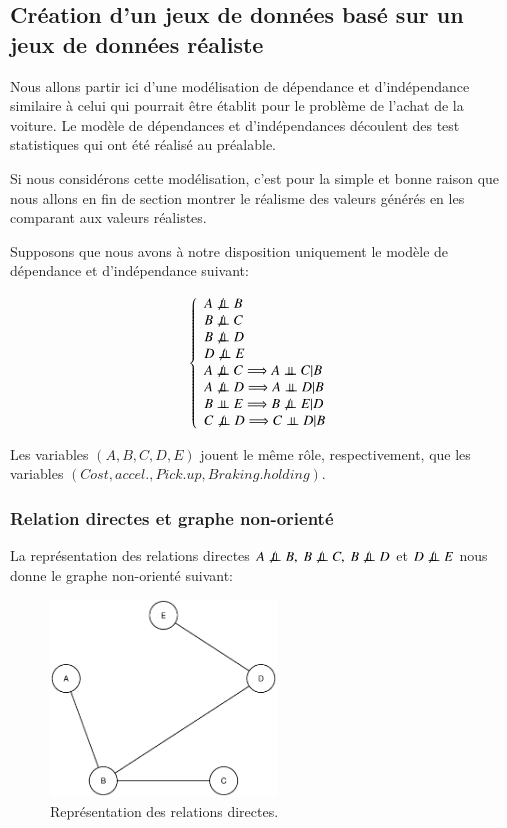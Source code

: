 \documentclass[a4paper]{article}
\begin{document}
\newpage
\subsection{Création d'un jeux de données basé sur un jeux de données réaliste}
\label{jeux_data}
Nous allons partir ici d'une modélisation de dépendance et d'indépendance similaire à celui qui pourrait être établit pour le problème de l'achat de la voiture. Le modèle de dépendances et d'indépendances découlent des test statistiques qui ont été réalisé au préalable.
 
Si nous considérons cette modélisation, c'est pour la simple et bonne raison que nous allons en fin de section montrer le réalisme des valeurs générés en les comparant aux valeurs réalistes.

Supposons que nous avons à notre disposition uniquement le modèle de dépendance et d'indépendance suivant:

\[
\left\lbrace 
\begin{array}{lcl}
A \not\ci B \\
B \not\ci C\\
B \not\ci D\\
D \not\ci E\\
A\not\ci C \Longrightarrow A\ci C|B\\
A\not\ci D \Longrightarrow A\ci D|B \\
B \ci E \Longrightarrow B\not\ci E|D \\
C\not\ci D \Longrightarrow C\ci D|B\\
\end{array}\right.
\]

Les variables $(A,B,C,D,E)$ jouent le même rôle, respectivement, que les variables $(Cost,accel.,Pick.up,Braking.holding)$.


\subsubsection{Relation directes et graphe non-orienté}

La représentation des relations directes $A \not\ci B,\  B \not\ci C,\  B \not\ci D$ et $D \not\perp\!\!\!\perp E$ nous donne le graphe non-orienté suivant:

\begin{figure}[H] 
    \center 
    \includegraphics[width=6cm]{creatgraph.eps} 
    \caption{Représentation des relations directes.} 
\end{figure} 
\end{document}
